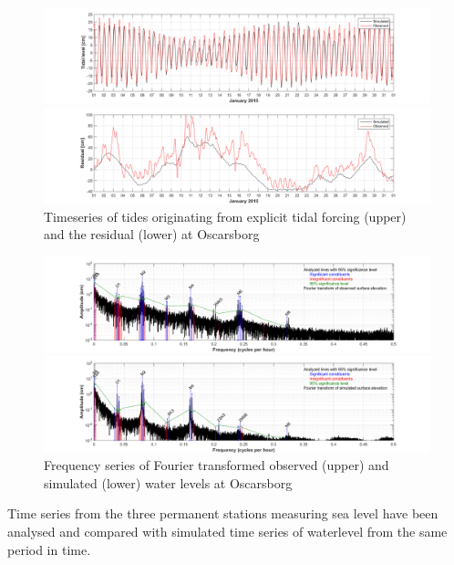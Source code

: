 \documentclass[12pt,a4paper,english]{article}
\begin{document}
\begin{figure}[t]
\centerline{
\includegraphics*[trim=3cm 0cm 2.5cm 0cm,clip=true,width=\textwidth]{Figurer/Oscarsborg_Tide_selected_jan15} 
}
\centerline{
\includegraphics*[trim=3cm 0cm 2.5cm 0cm,clip=true,width=\textwidth]{Figurer/Oscarsborg_WL_rest_jan15}
}
\caption{\small
Timeseries of tides originating from explicit tidal forcing (upper) and the residual (lower) at Oscarsborg}
\label{fig:Waterlevel_jan15}
\end{figure}

\begin{figure}[t]
\centerline{
\includegraphics*[trim=3cm 0cm 2.5cm 0cm,clip=true,width=\textwidth]{Figurer/Oscarsborg_Tide_Frequency_obs.png} 
}
\centerline{
\includegraphics*[trim=3cm 0cm 2.5cm 0cm,clip=true,width=\textwidth]{Figurer/Oscarsborg_Tide_Frequency_sim.png}
}
\caption{\small
Frequency series of Fourier transformed observed (upper) and simulated (lower) water levels at Oscarsborg}
\label{fig:Waterlevel_freq}
\end{figure}

Time series from the three permanent stations measuring sea level have been analysed and compared with simulated time series of waterlevel from the same period in time.
\end{document}
